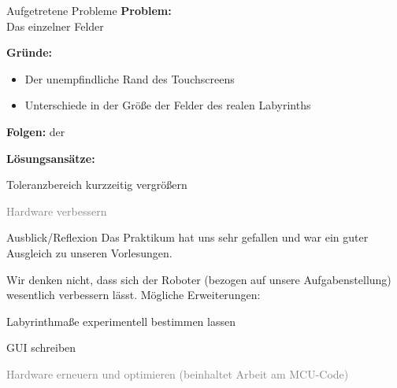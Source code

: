 \documentclass{beamer}
\begin{document}
\begin{frame}[fragile,t]{Aufgetretene Probleme}
\textbf{Problem:}\\
Das  einzelner Felder 

\medskip\noindent
\textbf{Gründe:}
\begin{itemize}
\item Der unempfindliche Rand des Touchscreens
\item Unterschiede in der Größe der Felder des realen Labyrinths
\end{itemize}

\medskip\noindent
\textbf{Folgen:}  der 

\medskip\noindent
\textbf{Lösungsansätze:}
\begin{itemize}
\item Toleranzbereich kurzzeitig vergrößern
\textcolor{gray}{
\item[\textcolor{gray}{$\triangleright$}] Hardware verbessern
}
\end{itemize}
\end{frame}

\begin{frame}[fragile,t]{Ausblick/Reflexion}
Das Praktikum hat uns sehr gefallen und war ein guter Ausgleich zu unseren Vorlesungen.

\medskip\noindent
Wir denken nicht, dass sich der Roboter (bezogen auf unsere Aufgabenstellung) wesentlich verbessern lässt. Mögliche Erweiterungen:
\begin{itemize}
\item Labyrinthmaße experimentell bestimmen lassen
\item GUI schreiben
\textcolor{gray}{
\item[\textcolor{gray}{$\triangleright$}] Hardware erneuern und optimieren (beinhaltet Arbeit am MCU-Code)
}
\end{itemize}
\end{frame}


\end{document}
